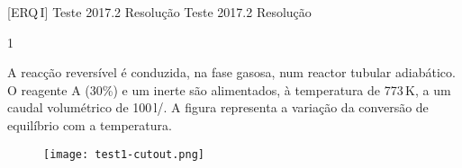 \documentclass[\mainfilename]{subfiles}
\begin{document}
\graphicspath{{\subfix{./.build/figures/ERQ_I-Testes_Resolucoes.2017.2}}}

[ERQ\,I]
{Teste 2017.2 Resolução} %
{Teste 2017.2 Resolução} %



\begin{questionBox}1{ %
    A reacção reversível  é conduzida, na fase gasosa, num reactor tubular adiabático. O reagente A (30\%) e um inerte são alimentados, à temperatura de 773\,\si{\kelvin}, a um caudal volumétrico de 100\,\si{\litre/\min}. A figura representa a variação da conversão de equilíbrio com a temperatura.
    \begin{figure}\centering
        \texttt{[image: test1-cutout.png]}
    \end{figure}
} %

\end{questionBox}
\end{document}
